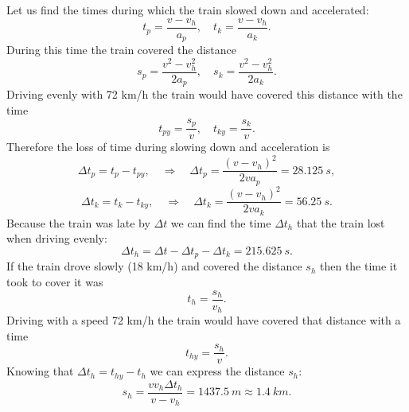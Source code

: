 \solueng
Let us find the times during which the train slowed down and accelerated:
\[ t_p = \frac{v - v_h}{a_p},\quad t_k = \frac{v-v_h}{a_k}. \]
During this time the train covered the distance
\[ s_p = \frac{v^2-v_h^2}{2a_p}, \quad s_k = \frac{v^2-v_h^2}{2a_k}. \]
Driving evenly with 72 km/h the train would have covered this distance with the time
\[ t_{py} = \frac{s_p}{v},\quad t_{ky} =\frac{s_k}{v}. \]
Therefore the loss of time during slowing down and acceleration is
\[ \Delta t_p =  t_{p} - t_{py}, \quad\Rightarrow\quad \Delta t_p = \frac{(v-v_h)^2}{2va_p}=\SI{28,125}{s},\]
\[ \Delta t_k =  t_{k} - t_{ky}, \quad\Rightarrow\quad \Delta t_k = \frac{(v-v_h)^2}{2va_k}=\SI{56,25}{s}.\]
Because the train was late by $\Delta t$ we can find the time $\Delta t_h$ that the train lost when driving evenly:
\[ \Delta t_h = \Delta t - \Delta t_p - \Delta t_k = \SI{215,625}{s}. \]
If the train drove slowly (18 km/h) and covered the distance $s_h$ then the time it took to cover it was
\[ t_h = \frac{s_h}{v_h}. \] 
Driving with a speed 72 km/h the train would have covered that distance with a time
\[ t_{hy} = \frac{s_h}{v}. \]
Knowing that $\Delta t_h = t_{hy} - t_h$ we can express the distance $s_h$:
\[ s_h = \frac{vv_h\Delta t_h}{v-v_h} = \SI{1437,5}{m} \approx \SI{1,4}{km}.\]
\probend